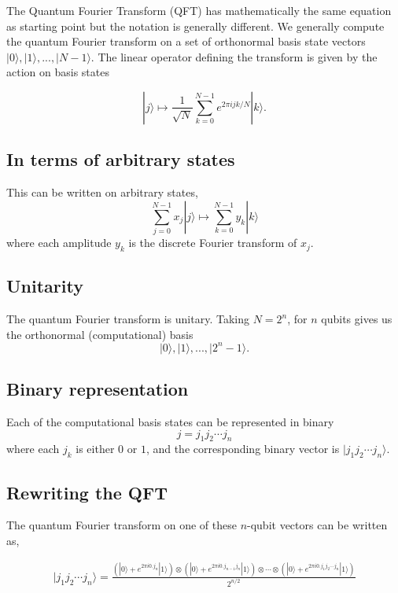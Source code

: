 \documentclass[%
oneside,                 %
final,                   %
10pt]{article}
\begin{document}
The Quantum Fourier Transform (QFT) has mathematically the same equation as starting point
but the notation is generally different. We generally compute the
quantum Fourier transform on a set of orthonormal basis state vectors
\(|0\rangle, |1\rangle, ..., |N-1\rangle\). The linear operator defining
the transform is given by the action on basis states

\[
|j\rangle \mapsto \frac{1}{\sqrt{N}} \sum_{k=0}^{N-1} e^{2\pi ijk/N}|k\rangle.
\]

\subsection{In terms of arbitrary states}

This can be written on arbitrary states,
\[
\sum_{j=0}^{N-1}x_j|j\rangle \mapsto \sum_{k=0}^{N-1} y_k|k\rangle
\]
where each amplitude \(y_k\) is the discrete Fourier transform of
\(x_j\).

\subsection{Unitarity}

The quantum Fourier transform is unitary. Taking \(N = 2^n\),
for \(n\) qubits gives us the orthonormal (computational) basis
\[
|0\rangle, |1\rangle, ..., |2^{n}-1\rangle.
\]

\subsection{Binary representation}

Each of the computational basis states can be represented in binary
\[
j = j_1j_2 \cdots j_n
\]
where each \(j_k\) is either \(0\) or \(1\), and the corresponding
binary vector is \(|j_1j_2 \cdots j_n\rangle\).

\subsection{Rewriting the QFT}

The quantum Fourier
transform on one of these \(n\)-qubit vectors can be written as,

\begin{align*}
|j_1j_2 \cdots j_n \rangle = \frac{\left(|0\rangle +e^{2\pi i0.j_n}|1\rangle\right) \otimes \left(|0\rangle +e^{2\pi i0.j_{n-1}j_n}|1\rangle\right) \otimes \cdots \otimes \left(|0\rangle +e^{2\pi i0.j_1j_2 \cdots j_n}|1\rangle\right)}{2^{n/2}}
\end{align*}
\end{document}
